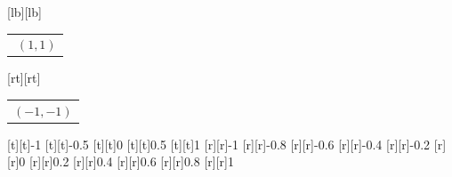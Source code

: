 %    
%
%
\begin{psfrags}%
\psfragscanon%
%
[lb][lb]{\color[rgb]{0,0,0}\setlength{\tabcolsep}{0pt}\begin{tabular}{l}$\;(1,1)$\end{tabular}}%
[rt][rt]{\color[rgb]{0,0,0}\setlength{\tabcolsep}{0pt}\begin{tabular}{r}$(-1,-1)$\end{tabular}}%
%
[t][t]{-1}%
[t][t]{-0.5}%
[t][t]{0}%
[t][t]{0.5}%
[t][t]{1}%
%
[r][r]{-1}%
[r][r]{-0.8}%
[r][r]{-0.6}%
[r][r]{-0.4}%
[r][r]{-0.2}%
[r][r]{0}%
[r][r]{0.2}%
[r][r]{0.4}%
[r][r]{0.6}%
[r][r]{0.8}%
[r][r]{1}%
%
%
\end{psfrags}%
%
